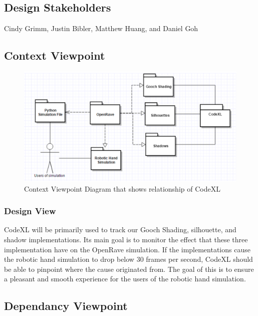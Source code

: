 \documentclass[10pt,journal,compsoc,draftclsnofoot]{IEEEtran}
\begin{document}
\begin{flushleft}
\subsection{Design Stakeholders}
Cindy Grimm, Justin Bibler, Matthew Huang, and Daniel Goh

\subsection{Context Viewpoint}

\begin{figure} [H]
  \includegraphics[scale=0.9]{CodeXL_Context.eps}
  \caption
{ \newline \hspace{\linewidth}
Context Viewpoint Diagram that shows relationship of CodeXL}
  \label{fig:CodeXL_Context}
\end{figure}

\subsubsection{Design View}
CodeXL will be primarily used to track our Gooch Shading, silhouette, and shadow implementations.
Its main goal is to monitor the effect that these three implementation have on the OpenRave simulation.
If the implementations cause the robotic hand simulation to drop below 30 frames per second, CodeXL should be able to pinpoint where the cause originated from.
The goal of this is to ensure a pleasant and smooth experience for the users of the robotic hand simulation.

\subsection{Dependancy Viewpoint}


\end{flushleft}
\end{document}
